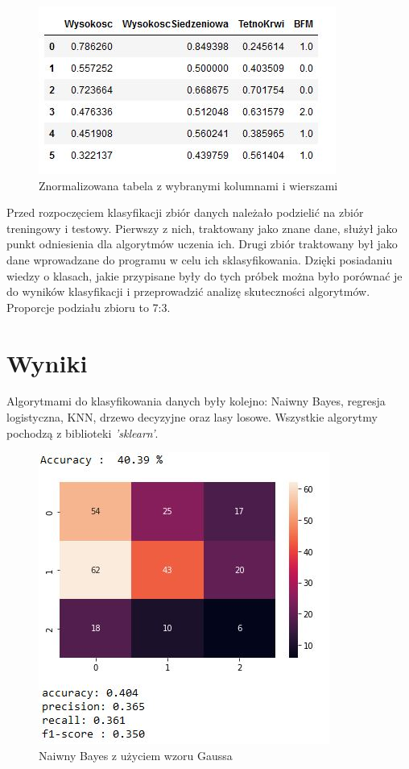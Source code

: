 \documentclass{article}
\begin{document}
    \begin{figure}[ht!]
		\centering
		\includegraphics[width=.6\textwidth]{ss/4.JPG}
		\caption{Znormalizowana tabela z wybranymi kolumnami i wierszami}
		\label{tab:norm}
	\end{figure}
     Przed rozpoczęciem klasyfikacji zbiór danych należało podzielić na zbiór treningowy i testowy. Pierwszy z nich, traktowany jako znane dane, służył jako punkt odniesienia dla algorytmów uczenia ich. Drugi zbiór traktowany był jako dane wprowadzane do programu w celu ich sklasyfikowania. Dzięki posiadaniu wiedzy o klasach, jakie przypisane były do tych próbek można było porównać je do wyników klasyfikacji i przeprowadzić analizę skuteczności algorytmów. Proporcje podziału zbioru to 7:3.
     \newpage
 
 \section{Wyniki}
    
    Algorytmami do klasyfikowania danych były kolejno: Naiwny Bayes, regresja logistyczna, KNN, drzewo decyzyjne oraz lasy losowe. Wszystkie algorytmy pochodzą z biblioteki \textit{'sklearn'}.\\
    
    \begin{figure}[ht!]
		\centering
		\includegraphics[width=.55\textwidth]{ss/5.JPG}
		\caption{Naiwny Bayes z użyciem wzoru Gaussa}
		\label{tab:nb}
	\end{figure}
	
\end{document}
